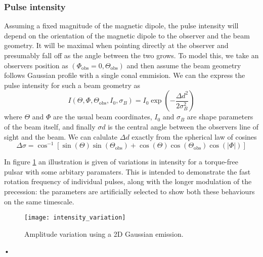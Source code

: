 \documentclass[/home/greg/Thesis/main/main.tex]{subfiles}
\begin{document}
\graphicspath{{/home/greg/Neutron_star_modelling/BeamwidthCalculation/img/}}

\newcommand{\ThetaO}{\Theta_{\mathrm{obs}}}
\newcommand{\PhiO}{\Phi_{\mathrm{obs}}}
\newcommand{\sigmaB}{\sigma_{B}}
\newcommand{\Imax}{I_{\textrm{max}}}

\subsubsection{Pulse intensity}

Assuming a fixed magnitude of the magnetic dipole, the pulse intensity will
depend on the orientation of the magnetic dipole to the observer and the beam
geometry. It will be maximal when pointing directly at the observer and
presumably fall off as the angle between the two grows. To model this, we take
an observers position as $(\PhiO=0, \ThetaO)$ and then assume the beam geometry
follows Gaussian profile with a single conal emmision.
We can the express the pulse intensity for such a beam geometry as
\begin{equation}
I
(\Theta, \Phi, \ThetaO,  I_{0}, \sigmaB) 
=
I_{0} \exp\left(-\frac{\Delta d^{2}}{2\sigmaB^{2}}\right)
\label{eqn: beam intensity}
\end{equation}
where $\Theta$ and $\Phi$ are the usual beam coordinates, $I_{0}$ and $\sigmaB$
are shape parameters of the beam itself, and finally $\sigma d$ is the central
angle between the observers line of sight and the beam.
We can calulate $\Delta d$ exactly from the spherical law of cosines
\begin{equation}
\Delta\sigma = \cos^{-1}\left[\sin(\Theta)\sin(\ThetaO) +
                              \cos(\Theta)\cos(\ThetaO)\cos(|\Phi|)\right]
\label{eqn: angular sep}
\end{equation}

In figure \ref{fig: intensity variation} an illustration is given of variations
in intensity for a torque-free pulsar with some arbitary paramaters. This is
intended to demonstrate the fast rotation frequency of individual pulses, along
with the longer modulation of the precession: the parameters are artificially
selected to show both these behaviours on the same timescale.
\begin{figure}[htb]
\centering
\texttt{[image: intensity\_variation]}
\caption{Amplitude variation using a 2D Gaussian emission.}
\label{fig: intensity variation}
\end{figure}•

\FloatBarrier
\end{document}
